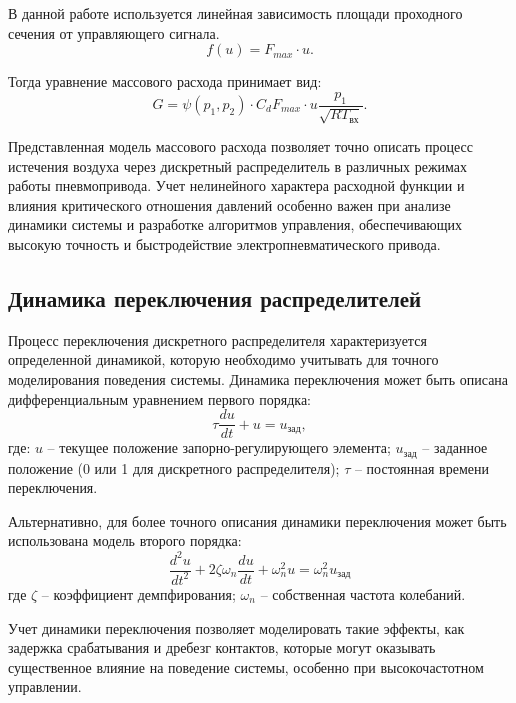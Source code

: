В данной работе используется линейная зависимость площади проходного сечения от управляющего сигнала.
\begin{equation*}
    f(u) = F_{max} \cdot u.
\end{equation*}

Тогда уравнение массового расхода принимает вид:
\begin{equation*}
    G = \psi(p_1, p_2) \cdot C_d F_{max} \cdot u \frac{p_1}{\sqrt{RT_\text{вх}}}.
\end{equation*}

Представленная модель массового расхода позволяет точно описать процесс истечения
воздуха через дискретный распределитель в различных режимах работы
пневмопривода. Учет нелинейного характера расходной функции и
влияния критического отношения давлений особенно важен при анализе динамики
системы и разработке алгоритмов управления, обеспечивающих высокую точность
и быстродействие электропневматического привода.

\subsection{Динамика переключения распределителей}\label{sec:ch2/sec3/subsec2}

Процесс переключения дискретного распределителя характеризуется
определенной динамикой, которую необходимо учитывать для точного моделирования поведения
системы. Динамика переключения может быть описана дифференциальным уравнением первого порядка:
\begin{equation}\label{eq:ch2/switching_dynamics}
    \tau \frac{du}{dt} + u = u_{зад},
\end{equation}
где:
$u$ -- текущее положение запорно-регулирующего элемента;
$u_{зад}$ -- заданное положение (0 или 1 для дискретного распределителя);
$\tau$ -- постоянная времени переключения.

Альтернативно, для более точного описания динамики переключения
может быть использована модель второго порядка:
\begin{equation}
    \frac{d^2u}{dt^2} + 2\zeta\omega_n\frac{du}{dt} + \omega_n^2u = \omega_n^2u_{зад}
\end{equation}
где $\zeta$ -- коэффициент демпфирования;
$\omega_n$ -- собственная частота колебаний.

Учет динамики переключения позволяет моделировать такие эффекты, как задержка
срабатывания и дребезг контактов, которые могут оказывать
существенное влияние на поведение системы,
особенно при высокочастотном управлении.

